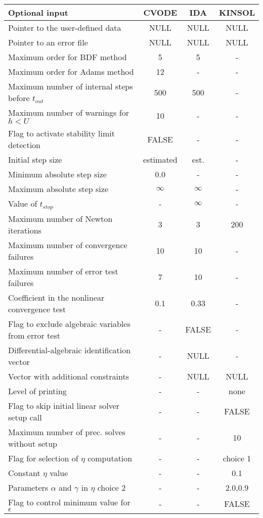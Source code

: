 \begin{acmtable}{340pt}
\centering
\begin{tabular}{p{2.75in} c c c }
Optional input & CVODE  & IDA & KINSOL \\
\hline
Pointer to the user-defined data & NULL & NULL& NULL \\
Pointer to an error file & NULL & NULL & NULL \\
Maximum order for BDF method & 5 & 5 & - \\
Maximum order for Adams method& 12  & - & - \\
Maximum number of internal steps before $t_{out}$ & 500 & 500 & - \\
Maximum number of warnings for $h < U$ & 10 & - & - \\
Flag to activate stability limit detection & FALSE & - & - \\
Initial step size & estimated & est. & - \\
Minimum absolute step size & 0.0 & - & - \\
Maximum absolute step size & $\infty$ & $\infty$ & - \\
Value of $t_{stop}$ & - & $\infty$ & - \\
Maximum number of Newton iterations & 3 & 3 & 200 \\
Maximum number of convergence failures & 10 & 10 & - \\
Maximum number of error test failures & 7 & 10 & - \\
Coefficient in the nonlinear convergence test & 0.1 & 0.33 & - \\
Flag to exclude algebraic variables from error test & - & FALSE & - \\
Differential-algebraic identification vector & - & NULL & - \\
Vector with additional constraints & - & NULL & NULL \\
Level of printing & - & - & none \\
Flag to skip initial linear solver setup call & - & - & FALSE \\
Maximum number of prec. solves without setup & - & - & 10 \\
Flag for selection of $\eta$ computation & - & - & choice 1 \\
Constant $\eta$ value & - & - & 0.1 \\
Parameters $\alpha$ and $\gamma$ in $\eta$ choice 2 & - & - & $2.0$,$0.9$\\
Flag to control minimum value for $\epsilon$ & - & - & FALSE \\

\end{tabular}
\end{acmtable}
